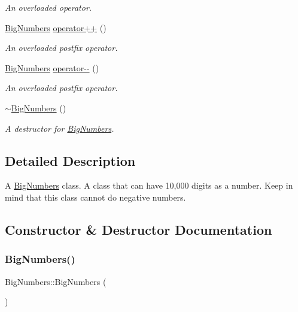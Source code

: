 \begin{DoxyCompactItemize}
\begin{DoxyCompactList}\small\item\em An overloaded operator. \end{DoxyCompactList}\item 
\mbox{\hyperlink{class_big_numbers}{Big\+Numbers}} \mbox{\hyperlink{class_big_numbers_ae1c896592285a27d67259837eaf582de}{operator++}} ()
\begin{DoxyCompactList}\small\item\em An overloaded postfix operator. \end{DoxyCompactList}\item 
\mbox{\hyperlink{class_big_numbers}{Big\+Numbers}} \mbox{\hyperlink{class_big_numbers_a22cd35000290cb5181af536639e7e588}{operator-\/-\/}} ()
\begin{DoxyCompactList}\small\item\em An overloaded postfix operator. \end{DoxyCompactList}\item 
\mbox{\label{class_big_numbers_aa5d87b5aecd5091822bdf7e102b13d5f}} 
\mbox{\hyperlink{class_big_numbers_aa5d87b5aecd5091822bdf7e102b13d5f}{$\sim$\+Big\+Numbers}} ()
\begin{DoxyCompactList}\small\item\em A destructor for \mbox{\hyperlink{class_big_numbers}{Big\+Numbers}}. \end{DoxyCompactList}\end{DoxyCompactItemize}


\subsection{Detailed Description}
A \mbox{\hyperlink{class_big_numbers}{Big\+Numbers}} class. A class that can have 10,000 digits as a number. Keep in mind that this class cannot do negative numbers. 

\subsection{Constructor \& Destructor Documentation}
\mbox{\label{class_big_numbers_af3dd82883f10f3473ac83280f26b0ad8}} 
\subsubsection{\texorpdfstring{Big\+Numbers()}{BigNumbers()}\hspace{0.1cm}{\footnotesize\ttfamily [1/2]}}
{\footnotesize\ttfamily Big\+Numbers\+::\+Big\+Numbers (\begin{DoxyParamCaption}{ }\end{DoxyParamCaption})}



